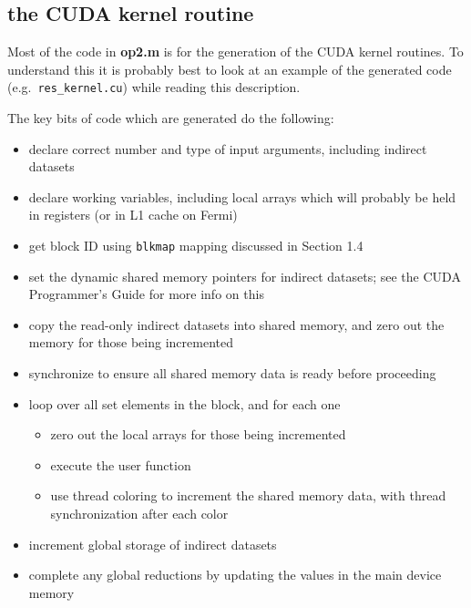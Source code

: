 \documentclass[12pt]{article}
\begin{document}

\subsection{the CUDA kernel routine}

Most of the code in {\bf op2.m} is for the generation of the CUDA 
kernel routines.  To understand this it is probably best to look
at an example of the generated code (e.g.~{\tt res\_kernel.cu})
while reading this description.

The key bits of code which are generated do the following:
\begin{itemize}
\item
declare correct number and type of input arguments, including
indirect datasets

\item
declare working variables, including local arrays which will probably
be held in registers (or in L1 cache on Fermi)

\item
get block ID using {\tt blkmap} mapping discussed in Section 1.4

\item
set the dynamic shared memory pointers for indirect datasets; see 
the CUDA Programmer's Guide for more info on this

\item
copy the read-only indirect datasets into shared memory, 
and zero out the memory for those being incremented

\item
synchronize to ensure all shared memory data is ready before proceeding

\item
loop over all set elements in the block, and for each one
 \begin{itemize}
 \item zero out the local arrays for those being incremented
 \item execute the user function
 \item use thread coloring to increment the shared memory data,
       with thread synchronization after each color
 \end{itemize}

\item
increment global storage of indirect datasets 

\item
complete any global reductions by updating the values in the main device 
memory

\end{itemize}
\end{document}
